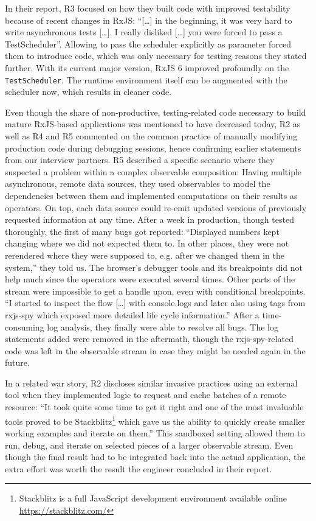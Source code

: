 \documentclass[sigplan,screen]{acmart}
\begin{document}
In their report, R3 focused on how they built code with improved testability because of recent changes in RxJS: ``[\dots] in the beginning, it was very hard to write asynchronous tests [\dots]. I really disliked [\dots] you were forced to pass a TestScheduler''. Allowing to pass the scheduler explicitly as parameter forced them to introduce code, which was only necessary for testing reasons they stated further. With its current major version, RxJS 6 improved profoundly on the  \texttt{TestScheduler}. The runtime environment itself can be augmented with the scheduler now, which results in cleaner code.

Even though the share of non-productive, testing-related code necessary to build mature RxJS-based applications was mentioned to have decreased today, R2 as well as R4 and R5 commented on the common practice of manually modifying production code during debugging sessions, hence confirming earlier statements from our interview partners. R5 described a specific scenario where they suspected a problem within a complex observable composition: Having multiple asynchronous, remote data sources, they used observables to model the dependencies between them and implemented computations on their results as operators. On top, each data source could re-emit updated versions of previously requested information at any time. After a week in production, though tested thoroughly, the first of many bugs got reported: ``Displayed numbers kept changing where we did not expected them to. In other places, they were not rerendered where they were supposed to, e.g. after we changed them in the system,'' they told us. The browser's debugger tools and its breakpoints did not help much since the operators were executed several times. Other parts of the stream were impossible to get a handle upon, even with conditional breakpoints. ``I started to inspect the flow [\dots] with console.logs and later also using tags from rxjs-spy which exposed more detailed life cycle information.'' After a time-consuming log analysis, they finally were able to resolve all bugs. The log statements added were removed in the aftermath, though the rxjs-spy-related code was left in the observable stream in case they might be needed again in the future.

In a related war story, R2 discloses similar invasive practices using an external tool when they implemented logic to request and cache batches of a remote resource: ``It took quite some time to get it right and one of the most invaluable tools proved to be Stackblitz\footnote{Stackblitz is a full JavaScript development environment available online \url{https://stackblitz.com/}} which gave us the ability to quickly create smaller working examples and iterate on them.'' This sandboxed setting allowed them to run, debug, and iterate on selected pieces of a larger observable stream. Even though the final result had to be integrated back into the actual application, the extra effort was worth the result the engineer concluded in their report.
\end{document}
